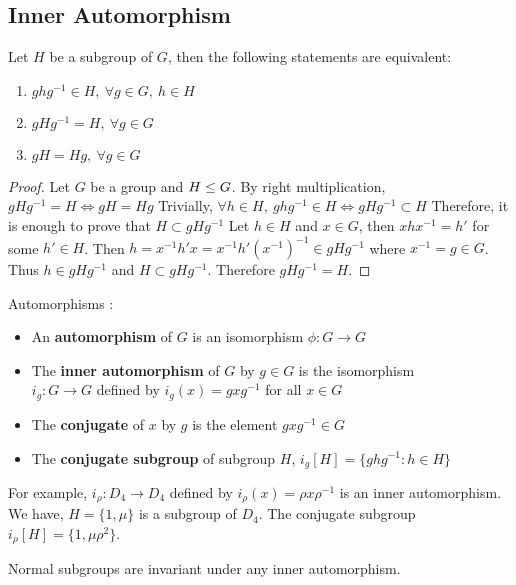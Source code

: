 \subsection{Inner Automorphism}
\begin{theorem}
	Let $H$ be a subgroup of $G$, then the following statements are equivalent:
	\begin{enumerate}
		\item $ghg^{-1} \in H,\ \forall g \in G,\ h \in H$
		\item $gHg^{-1} = H,\ \forall g \in G$
		\item $gH = Hg,\ \forall g \in G$
	\end{enumerate}
\end{theorem}
\begin{proof}
	Let $G$ be a group and $H \le G$.
	By right multiplication,  $gHg^{-1} = H \iff gH = Hg$
	Trivially, $\forall h \in H,\ ghg^{-1} \in H \iff gHg^{-1} \subset H$
	Therefore, it is enough to prove that $H \subset gHg^{-1}$
	Let $h \in H$ and $x \in G$, then $xhx^{-1} = h'$ for some $h' \in H$.
	Then $h = x^{-1}h'x = x^{-1}h'(x^{-1})^{-1} \in gHg^{-1}$ where $x^{-1} = g \in G$.
	Thus $h \in gHg^{-1}$ and $H \subset gHg^{-1}$.
	Therefore $gHg^{-1} = H$.
\end{proof}

\begin{definition}Automorphisms : 
\begin{itemize}
	\item An \textbf{automorphism} of $G$ is an isomorphism $\phi : G \to G$
	\item The \textbf{inner automorphism} of $G$ by $g \in G$ is the isomorphism\\
	$i_g : G \to G$ defined by $i_g(x) = gxg^{-1}$ for all $x \in G$
	\item The \textbf{conjugate} of $x$ by $g$ is the element $gxg^{-1} \in G$
	\item The \textbf{conjugate subgroup} of subgroup $H$, $i_g[H] = \{ ghg^{-1} : h \in H \}$
\end{itemize}
\end{definition}

\begin{remark}
	For example, $i_\rho : D_4 \to D_4$ defined by $i_\rho(x) = \rho x \rho^{-1}$ is an inner automorphism.
	We have, $H = \{ 1,\mu \}$ is a subgroup of $D_4$.
	The conjugate subgroup $i_\rho[H] = \{ 1,\mu\rho^2 \}$.
\end{remark}

\begin{remark}
	Normal subgroups are invariant under any inner automorphism.
\end{remark}

